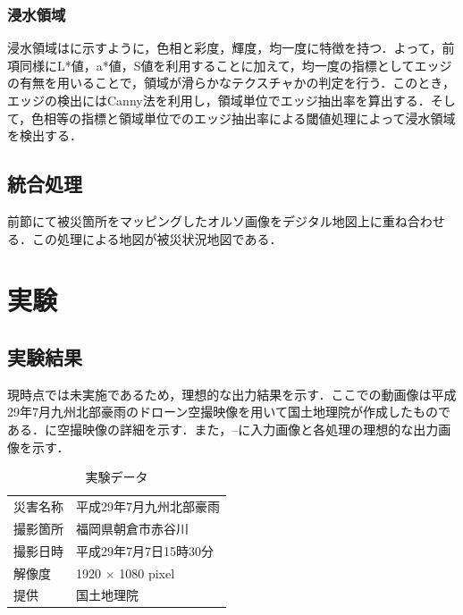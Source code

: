\documentclass[a4paper, twocolumn, xelatex, 10pt, ja=standard, Ligatures=TeX]{bxjsarticle}
\begin{document}
	\subsubsection{浸水領域}
		浸水領域はに示すように，色相と彩度，輝度，均一度に特徴を持つ．よって，前項同様にL*値，a*値，S値を利用することに加えて，均一度の指標としてエッジの有無を用いることで，領域が滑らかなテクスチャかの判定を行う．このとき，エッジの検出にはCanny法を利用し，領域単位でエッジ抽出率を算出する．そして，色相等の指標と領域単位でのエッジ抽出率による閾値処理によって浸水領域を検出する．

\subsection{統合処理}
	前節にて被災箇所をマッピングしたオルソ画像をデジタル地図上に重ね合わせる．この処理による地図が被災状況地図である．	


\section{実験}
\subsection{実験結果}
	現時点では未実施であるため，理想的な出力結果を示す．ここでの動画像は平成29年7月九州北部豪雨のドローン空撮映像\cite{web01}を用いて国土地理院が作成したものである．に空撮映像の詳細を示す．また，--に入力画像と各処理の理想的な出力画像を示す．
	
	\begin{table}[b]
		\centering
		\caption{実験データ}
		\label{tab03}
		\begin{tabular}{l l}
			\hline
			災害名称 & 平成29年7月九州北部豪雨 \\
			撮影箇所 & 福岡県朝倉市赤谷川 \\
			撮影日時 & 平成29年7月7日15時30分 \\
			解像度 & 1920 × 1080 pixel \\
			提供 & 国土地理院 \\ \hline
		\end{tabular}
	\end{table}
	
\end{document}

